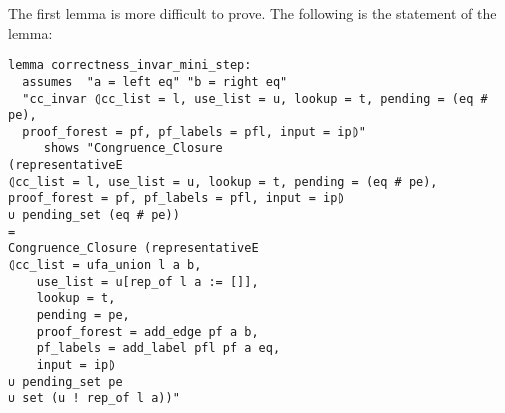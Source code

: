 The first lemma is more difficult to prove. The following is the statement of the lemma:

\begin{lstlisting}[label=lst:correctness_invar_mini_step]
lemma correctness_invar_mini_step:
  assumes  "a = left eq" "b = right eq"
  "cc_invar ⦇cc_list = l, use_list = u, lookup = t, pending = (eq # pe),
  proof_forest = pf, pf_labels = pfl, input = ip⦈"
     shows "Congruence_Closure
(representativeE
⦇cc_list = l, use_list = u, lookup = t, pending = (eq # pe),
proof_forest = pf, pf_labels = pfl, input = ip⦈
∪ pending_set (eq # pe))
=
Congruence_Closure (representativeE
⦇cc_list = ufa_union l a b,
    use_list = u[rep_of l a := []],
    lookup = t,
    pending = pe,
    proof_forest = add_edge pf a b,
    pf_labels = add_label pfl pf a eq,
    input = ip⦈
∪ pending_set pe
∪ set (u ! rep_of l a))"
\end{lstlisting}

